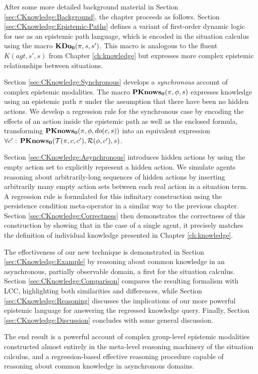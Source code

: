 After some more detailed background material in Section \ref{sec:CKnowledge:Background},
the chapter proceeds as follows. Section \ref{sec:CKnowledge:Epistemic-Paths}
defines a variant of first-order dynamic logic for use as an epistemic
path language, which is encoded in the situation calculus using the
macro $\mathbf{KDo_{0}}(\pi,s,s')$. This macro is analogous to the fluent $K(agt,s',s)$
from Chapter \ref{ch:knowledge} but expresses more complex epistemic
relationships between situations.

Section \ref{sec:CKnowledge:Synchronous} develops a \emph{synchronous}
account of complex epistemic modalities. The macro $\mathbf{PKnows_{0}}(\pi,\phi,s)$
expresses knowledge using an epistemic path $\pi$ under the assumption
that there have been no hidden actions. We develop a regression rule
for the synchronous case by encoding the effects of an action inside
the epistemic path as well as the enclosed formula, transforming $\mathbf{PKnows_{0}}(\pi,\phi,do(c,s))$
into an equivalent expression $\forall c':\,\mathbf{PKnows_{0}}(\mathcal{T}(\pi,c,c'),\mathcal{R}(\phi,c'),s)$.

Section \ref{sec:CKnowledge:Asynchronous} introduces hidden actions
by using the empty action set to explicitly represent a hidden action.
We simulate agents reasoning about arbitrarily-long sequences of hidden
actions by inserting arbitrarily many empty action sets between each
real action in a situation term. A regression rule is formulated for
this infinitary construction using the persistence condition meta-operator
in a similar way to the previous chapter. Section \ref{sec:CKnowledge:Correctness}
then demonstrates the correctness of this construction by showing
that in the case of a single agent, it precisely matches the definition
of individual knowledge presented in Chapter \ref{ch:knowledge}.

The effectiveness of our new technique is demonstrated in Section
\ref{sec:CKnowledge:Example} by reasoning about common knowledge
in an asynchronous, partially observable domain, a first for the situation
calculus. Section \ref{sec:CKnowledge:Comparison} compares the resulting
formalism with LCC, highlighting both similarities and differences,
while Section \ref{sec:CKnowledge:Reasoning} discusses the implications
of our more powerful epistemic language for answering the regressed
knowledge query. Finally, Section \ref{sec:CKnowledge:Discussion}
concludes with some general discussion.

The end result is a powerful account of complex group-level epistemic
modalities constructed almost entirely in the meta-level reasoning
machinery of the situation calculus, and a regression-based effective
reasoning procedure capable of reasoning about common knowledge in
asynchronous domains.


